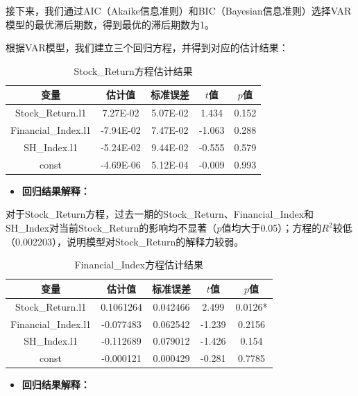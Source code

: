 \documentclass[12pt]{article}
\begin{document}
接下来，我们通过AIC（Akaike信息准则）和BIC（Bayesian信息准则）选择VAR模型的最优滞后期数，得到最优的滞后期数为1。


根据VAR模型，我们建立三个回归方程，并得到对应的估计结果：

\begin{table}[H]
    \centering
    \caption{Stock\_Return方程估计结果}
    \label{tab:VAR1}
    \begin{tabular}{ccccc}
        \toprule
        变量 & 估计值 & 标准误差 & $t$值 & $p$值 \\
        \midrule
Stock\_Return.l1    & 7.27E-02  & 5.07E-02 & 1.434  & 0.152 \\
Financial\_Index.l1 & -7.94E-02 & 7.47E-02 & -1.063 & 0.288 \\
SH\_Index.l1        & -5.24E-02 & 9.44E-02 & -0.555 & 0.579 \\
const               & -4.69E-06 & 5.12E-04 & -0.009 & 0.993 \\
        \bottomrule
    \end{tabular}
\end{table}

\begin{itemize}
    \item \textbf{回归结果解释：}
\end{itemize}

对于Stock\_Return方程，过去一期的Stock\_Return、Financial\_Index和SH\_Index对当前Stock\_Return的影响均不显著（$p$值均大于0.05）；方程的$R^2$较低（0.002203），说明模型对Stock\_Return的解释力较弱。


\begin{table}[H]
    \centering
    \caption{Financial\_Index方程估计结果}
    \label{tab:VAR2}
    \begin{tabular}{ccccc}
        \toprule
        变量 & 估计值 & 标准误差 & $t$值 & $p$值 \\
        \midrule
Stock\_Return.l1    & 0.1061264 & 0.042466 & 2.499  & 0.0126* \\
Financial\_Index.l1 & -0.077483 & 0.062542 & -1.239 & 0.2156  \\
SH\_Index.l1        & -0.112689 & 0.079012 & -1.426 & 0.154   \\
const               & -0.000121 & 0.000429 & -0.281 & 0.7785  \\
        \bottomrule
    \end{tabular}
\end{table}

\begin{itemize}
    \item \textbf{回归结果解释：}
\end{itemize}
\end{document}
